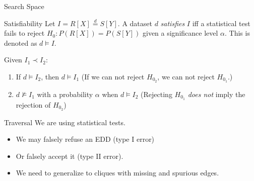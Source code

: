 \documentclass[10pt,compress]{beamer}
\newcommand{\eqdist}{\stackrel{d}{=}}
\begin{document}
\begin{frame}{Search Space}
    \begin{alertblock}{Satisfiability}
    Let $I = R[X] \eqdist S[Y]$.
    A dataset $d$ \emph{satisfies} $I$ iff  a statistical test fails to reject $H_0: P(R[X]) = P(S[Y])$
    given a significance level $\alpha$.
    This is denoted as $d \models I$.

    \medskip
    
    Given $I_1 \prec I_2$:
    
    \begin{enumerate}
        \item If $d \models I_2$, then $d \models I_1$ (If we can not reject $H_{0_2}$, we can not reject $H_{0_1}$.)
        \item $d \not\models I_1$ with a probability $\alpha$ when $d \models I_2$
            (Rejecting $H_{0_1}$ \emph{does not} imply the rejection of $H_{0_2}$)
    \end{enumerate}
    
    \end{alertblock}


\end{frame}

\begin{frame}{Traversal}
    We are using statistical tests.
    
    \begin{itemize}
        \item We may falsely refuse an EDD (type I error)
        \item Or falsely accept it (type II error).
        \item We need to generalize to cliques with missing and spurious edges.
    \end{itemize}
\end{frame}
\end{document}
